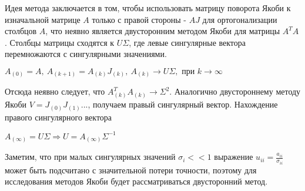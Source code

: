 Идея метода заключается в том, чтобы использовать матрицу поворота Якоби к изначальной матрице $A$ только с правой стороны - $AJ$ для ортогонализации столбцов $A$, что неявно является двусторонним методом Якоби для матрицы $A^TA$.
Столбцы матрицы сходятся к $U\Sigma$, где левые сингулярные вектора перемножаются с сингулярными значениями.
\begin{center}
     $A_{(0)}=A,\ A_{(k+1)} = A_{(k)}J_{(k)},\ A_{(k)} \longrightarrow U\Sigma, \text{ при } k\to\infty$
 \end{center}
 Отсюда неявно следует, что $A^T_{(k)}A_{(k)} \to \Sigma^2$. Аналогично двустороннему методу Якоби $V = J_{(0)}J_{(1)}...$, получаем правый сингулярный вектор. Нахождение правого сингулярного вектора 
 \begin{center}
     $A_{(\infty)} = U\Sigma \Rightarrow U = A_{(\infty)}\Sigma^{-1}$
 \end{center}
 Заметим, что при малых сингулярных значений $\sigma_i<<1$ выражение $u_{ii} = \frac{a_{ii}}{\sigma_{ii}}$ может быть подсчитано с значительной потери точности, поэтому для исследования методов Якоби будет рассматриваться двусторонний метод.

